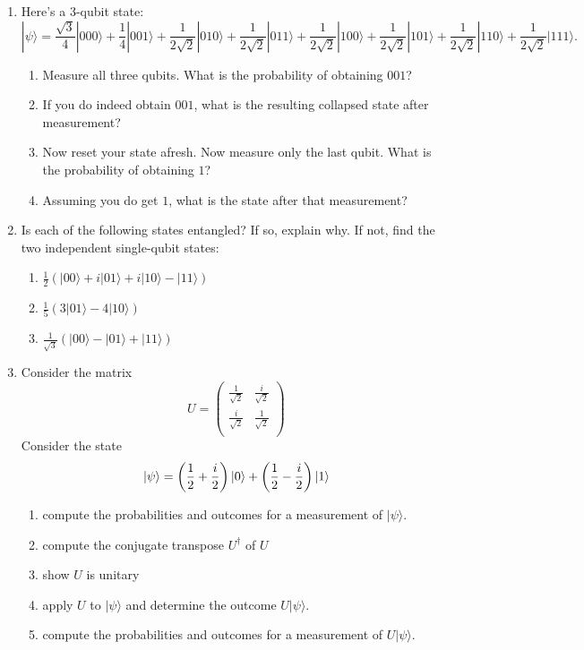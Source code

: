 \documentclass{article}
\theoremstyle{plain}
\theoremstyle{definition}
\theoremstyle{remark}
\numberwithin{theorem}{section}
\begin{document}
\begin{enumerate}
\item Here's a 3-qubit state:
\[
|\psi \rangle =
\frac{\sqrt{3}}{4} |000\rangle +
\frac{1}{4} |001\rangle +
\frac{1}{2\sqrt{2}} |010\rangle +
\frac{1}{2\sqrt{2}}  |011\rangle +
\frac{1}{2\sqrt{2}}  |100\rangle +
\frac{1}{2\sqrt{2}}  |101\rangle +
\frac{1}{2\sqrt{2}}  |110\rangle +
\frac{1}{2\sqrt{2}}  |111\rangle.
\]
\begin{enumerate}
    \item Measure all three qubits.  What is the probability of obtaining $001$?
    \item If you do indeed obtain $001$, what is the resulting collapsed state after measurement?
    \item Now reset your state afresh.  Now measure only the last qubit.  What is the probability of obtaining $1$?
    \item Assuming you do get $1$, what is the state after that measurement?
\end{enumerate}
\item Is each of the following states entangled?  If so, explain why.  If not, find the two independent single-qubit states:
\begin{enumerate}
    \item $\frac{1}{2}\left( 
    | 00 \rangle +
    i| 01 \rangle +
    i| 10 \rangle 
    -| 11 \rangle
    \right)$
    \item $\frac{1}{5}\left( 
      3| 01 \rangle 
    -4| 10 \rangle
    \right)$
    \item $\frac{1}{\sqrt{3}}\left( 
      | 00 \rangle 
      -| 01 \rangle 
    +| 11 \rangle
    \right)$    
\end{enumerate}
    \item Consider the matrix
    \[
    U = 
    \begin{pmatrix} 
    \frac{1}{\sqrt{2}} & \frac{i}{\sqrt{2}} \\
    \frac{i}{\sqrt{2}} & \frac{1}{\sqrt{2}} \\
    \end{pmatrix}
    \]
    Consider the state
    \[
    | \psi \rangle=
    \left( \frac{1}{2} + \frac{i}{2} \right) |0 \rangle
    +
    \left( \frac{1}{2} - \frac{i}{2} \right) |1\rangle
    \]
    \begin{enumerate}
    \item compute the probabilities and outcomes for a measurement of $|\psi\rangle$.
        \item compute the conjugate transpose $U^\dagger$ of $U$
        \item show $U$ is unitary
        \item apply $U$ to $| \psi \rangle$ and determine the outcome $U | \psi \rangle$.
        \item compute the probabilities and outcomes for a measurement of $U|\psi \rangle$.        %
    \end{enumerate}


\end{enumerate}
\end{document}
